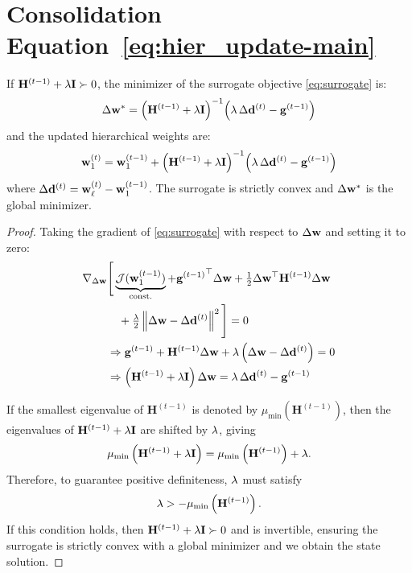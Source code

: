 



\section{Consolidation Equation~\eqref{eq:hier_update-main}}
\label{app:update-proof}

\begin{theorem}
\label{prop:main}
If $\mathbf{H}^{(t-1)} + \lambda \mathbf{I} \succ 0$, the minimizer of the surrogate objective \eqref{eq:surrogate} is:
\begin{equation}
\label{eq:deltaW}
\Delta\mathbf{w}^{*} = \left(\mathbf{H}^{(t-1)} + \lambda \mathbf{I}\right)^{-1}\!\left(\lambda \, \Delta\mathbf{d}^{(t)} - \mathbf{g}^{(t-1)}\right)
\end{equation}
and the updated hierarchical weights are:
\begin{equation}
\label{eq:hier_update}
\mathbf{w}_{1}^{(t)} = \mathbf{w}_{1}^{(t-1)} + \left(\mathbf{H}^{(t-1)} + \lambda \mathbf{I}\right)^{-1}\!\left(\lambda \, \Delta\mathbf{d}^{(t)} - \mathbf{g}^{(t-1)}\right)
\end{equation}
where $\Delta\mathbf{d}^{(t)} = \mathbf{w}_{\ell}^{(t)} - \mathbf{w}_{1}^{(t-1)}$. The surrogate is strictly convex and $\Delta\mathbf{w}^{*}$ is the global minimizer.
\end{theorem}

\begin{proof}

Taking the gradient of \eqref{eq:surrogate} with respect to $\Delta\mathbf{w}$ and setting it to zero:
\begin{align*}
    \nabla_{\Delta\mathbf{w}} &\Bigg[ \underbrace{\mathcal{J}(\mathbf{w}_{1}^{(t-1)})}_{\text{const.}} + {\mathbf{g}^{(t-1)}}^\top \Delta\mathbf{w} + \tfrac{1}{2} \Delta\mathbf{w}^\top \mathbf{H}^{(t-1)} \Delta\mathbf{w} \\
    &\quad + \tfrac{\lambda}{2} \left\| \Delta\mathbf{w} - \Delta\mathbf{d}^{(t)} \right\|^2 \Bigg] = 0 \\
    &\Rightarrow \mathbf{g}^{(t-1)} + \mathbf{H}^{(t-1)} \Delta\mathbf{w} + \lambda \left(\Delta\mathbf{w} - \Delta\mathbf{d}^{(t)}\right) = 0 \\
    &\Rightarrow \left(\mathbf{H}^{(t-1)} + \lambda \mathbf{I}\right) \Delta\mathbf{w} = \lambda \, \Delta\mathbf{d}^{(t)} - \mathbf{g}^{(t-1)} 
\end{align*}

If the smallest eigenvalue of $\mathbf{H}^{(t-1)}$ is denoted by $\mu_{\min}(\mathbf{H}^{(t-1)})$, then the eigenvalues of $\mathbf{H}^{(t-1)} + \lambda \mathbf{I}$ are shifted by $\lambda$, giving
\begin{equation*}
    \mu_{\min}\left(\mathbf{H}^{(t-1)} + \lambda \mathbf{I}\right) = \mu_{\min}\left(\mathbf{H}^{(t-1)}\right) + \lambda.
\end{equation*}
Therefore, to guarantee positive definiteness, $\lambda$ must satisfy
\begin{equation*}
    \lambda > -\mu_{\min}\left(\mathbf{H}^{(t-1)}\right).
\end{equation*}
If this condition holds, then $\mathbf{H}^{(t-1)} + \lambda \mathbf{I} \succ 0$ and is invertible, ensuring the surrogate is strictly convex with a global minimizer and we obtain the state solution. 
\end{proof}

